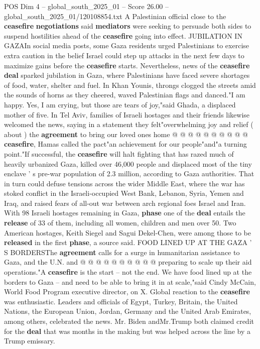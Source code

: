 \begin{textsample}{POS Dim 4 – global\_south\_2025\_01 – Score 26.00 – global\_south\_2025\_01/120108854.txt}
A Palestinian official close to the \textbf{ceasefire} \textbf{negotiations} said \textbf{mediators} were seeking to persuade both sides to suspend hostilities ahead of the \textbf{ceasefire} going into effect.
JUBILATION IN GAZAIn social media posts, some Gaza residents urged Palestinians to exercise extra caution in the belief Israel could step up attacks in the next few days to maximize gains before the \textbf{ceasefire} starts.
Nevertheless, news of the \textbf{ceasefire} \textbf{deal} sparked jubilation in Gaza, where Palestinians have faced severe shortages of food, water, shelter and fuel.
In Khan Younis, throngs clogged the streets amid the sounds of horns as they cheered, waved Palestinian flags and danced."I am happy.
Yes, I am crying, but those are tears of joy,"said Ghada, a displaced mother of five.
In Tel Aviv, families of Israeli hostages and their friends likewise welcomed the news, saying in a statement they felt"overwhelming joy and relief ( about ) the \textbf{agreement} to bring our loved ones home @ @ @ @ @ @ @ @ @ @ \textbf{ceasefire}, Hamas called the pact"an achievement for our people"and"a turning point."If successful, the \textbf{ceasefire} will halt fighting that has razed much of heavily urbanized Gaza, killed over 46,000 people and displaced most of the tiny enclave ' s pre-war population of 2.3 million, according to Gaza authorities.
That in turn could defuse tensions across the wider Middle East, where the war has stoked conflict in the Israeli-occupied West Bank, Lebanon, Syria, Yemen and Iraq, and raised fears of all-out war between arch regional foes Israel and Iran.
With 98 Israeli hostages remaining in Gaza, \textbf{phase} one of the \textbf{deal} entails the \textbf{release} of 33 of them, including all women, children and men over 50.
Two American hostages, Keith Siegel and Sagui Dekel-Chen, were among those to be \textbf{released} in the first \textbf{phase}, a source said.
FOOD LINED UP AT THE GAZA ' S BORDERSThe \textbf{agreement} calls for a surge in humanitarian assistance to Gaza, and the U.N. and @ @ @ @ @ @ @ @ @ @ preparing to scale up their aid operations."A \textbf{ceasefire} is the start -- not the end.
We have food lined up at the borders to Gaza -- and need to be able to bring it in at scale,"said Cindy McCain, World Food Program executive director, on X.
Global reaction to the \textbf{ceasefire} was enthusiastic.
Leaders and officials of Egypt, Turkey, Britain, the United Nations, the European Union, Jordan, Germany and the United Arab Emirates, among others, celebrated the news.
Mr.
Biden andMr.Trump both claimed credit for the \textbf{deal} that was months in the making but was helped across the line by a Trump emissary.

\end{textsample}
